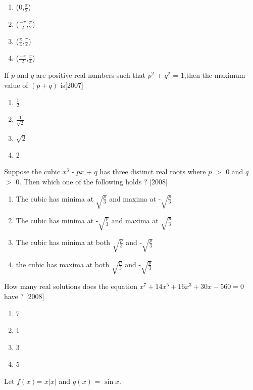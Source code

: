 \documentclass[journal,12pt,twocolumn]{IEEEtran}
\theoremstyle{remark}
\begin{document}
        \begin{enumerate}
        
            
        
      \item (0,$\frac{\pi}{2}$)
        \item ($\frac{-\pi}{2}$,$\frac{\pi}{2}$)
        \item ($\frac{\pi}{4}$,$\frac{\pi}{2}$)
        \item ($\frac{-\pi}{2}$,$\frac{\pi}{4}$)
        
            
        
            
        
        \end{enumerate}
        \item If $p$ and $q$ are positive real numbers such that $p^2$ + $q^2$ = 1,then the maximum value of $(p + q)$ is\hfill[2007]
        \begin{enumerate}
        
            

        \item $\frac{1}{2}$
        \item $\frac{1}{\sqrt{2}}$
        \item $\sqrt{2}$
        \item 2
        \end{enumerate}
        \item Suppose the cubic $x^3$ - $p$$x$ + $q$ has three distinct real roots where $p$ $>$ 0 and $q$ $>$ 0. Then which one of the following holds ? \hfill[2008]
        \begin{enumerate}
        
            
        
        \item The cubic has minima at $\sqrt{\frac{p}{3}}$ and maxima at -$\sqrt{\frac{p}{3}}$
        \item The cubic has minima at -$\sqrt{\frac{p}{3}}$ and maxima at $\sqrt{\frac{p}{3}}$
        \item The cubic has minima at both $\sqrt{\frac{p}{3}}$ and -$\sqrt{\frac{p}{3}}$
        \item the cubic has maxima at both $\sqrt{\frac{p}{3}}$ and -$\sqrt{\frac{p}{3}}$
        
        
        \end{enumerate}
        \item How many real solutions does the equation $ x^7 + 14x^5 + 16x^3 + 30x- 560 = 0$ have ? \hfill[2008]
        \begin{enumerate}
    
            
        
            \item 7
        \item 1
        \item 3
        \item 5
        
        \end{enumerate}        \item Let $f(x)$= $x$$\left |x\right|$ and $g(x)$ = $\sin{x}$.
        
\end{document}
